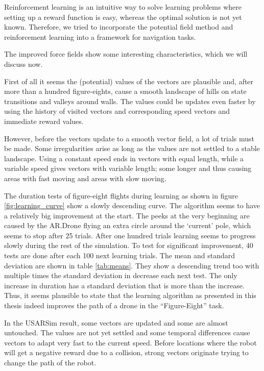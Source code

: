 \documentclass[11pt]{article}
\begin{document}
Reinforcement learning is an intuitive way to solve learning problems where setting up a reward function is easy, whereas the optimal solution is not yet known. Therefore, we tried to incorporate the potential field method and reinforcement learning into a framework for navigation tasks.

The improved force fields show some interesting characteristics, which we will discuss now.

First of all it seems the (potential) values of the vectors are plausible and, after more than a hundred figure-eights, cause a smooth landscape of hills on state transitions and valleys around walls. The values could be updates even faster by using the history of visited vectors and corresponding speed vectors and immediate reward values.

However, before the vectors update to a smooth vector field, a lot of trials must be made. Some irregularities arise as long as the values are not settled to a stable landscape. Using a constant speed ends in vectors with equal length, while a variable speed gives vectors with variable length; some longer and thus causing areas with fast moving and areas with slow moving.

The duration tests of figure-eight flights during learning as shown in figure \ref{fig:learning_curve} show a slowly descending curve. The algorithm seems to have a relatively big improvement at the start. The peeks at the very beginning are caused by the AR.Drone flying an extra circle around the `current' pole, which seems to stop after 25 trials. After one hundred trials learning seems to progress slowly during the rest of the simulation. To test for significant improvement, 40 tests are done after each 100 next learning trials. The mean and standard deviation are shown in table \ref{tab:means}. They show a descending trend too with multiple times the standard deviation in decrease each next test. The only increase in duration has a standard deviation that is more than the increase. Thus, it seems plausible to state that the learning algorithm as presented in this thesis indeed improves the path of a drone in the ``Figure-Eight'' task.

In the USARSim result, some vectors are updated and some are almost untouched. The values are not yet settled and some temporal differences cause vectors to adapt very fast to the current speed. Before locations where the robot will get a negative reward due to a collision, strong vectors originate trying to change the path of the robot.
\end{document}
